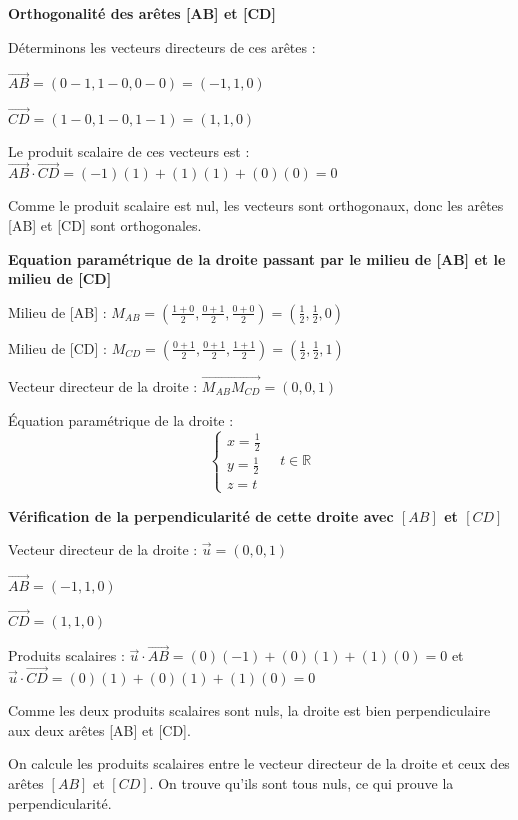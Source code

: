\documentclass[10pt,a4paper]{article}
\begin{document}
\q \textbf{Orthogonalité des arêtes [AB] et [CD]}

Déterminons les vecteurs directeurs de ces arêtes :

$\overrightarrow{AB} = (0-1, 1-0, 0-0) = (-1, 1, 0)$

$\overrightarrow{CD} = (1-0, 1-0, 1-1) = (1, 1, 0)$

Le produit scalaire de ces vecteurs est :
$\overrightarrow{AB} \cdot \overrightarrow{CD} = (-1)(1) + (1)(1) + (0)(0) = 0$

Comme le produit scalaire est nul, les vecteurs sont orthogonaux, donc les arêtes [AB] et [CD] sont
orthogonales.


\q \textbf{Equation paramétrique de la droite passant par le milieu de [AB] et le milieu de [CD]}

Milieu de [AB] : $M_{AB} = (\frac{1+0}{2}, \frac{0+1}{2}, \frac{0+0}{2}) = (\frac{1}{2}, \frac{1}{2}, 0)$

Milieu de [CD] : $M_{CD} = (\frac{0+1}{2}, \frac{0+1}{2}, \frac{1+1}{2}) = (\frac{1}{2}, \frac{1}{2}, 1)$

Vecteur directeur de la droite : $\overrightarrow{M_{AB}M_{CD}} = (0, 0, 1)$

Équation paramétrique de la droite :
$$ \begin{cases}
x = \frac{1}{2} \\
y = \frac{1}{2} \\
z = t
\end{cases} \quad t \in  \mathbb{R}$$


\q \textbf{Vérification de la perpendicularité de cette droite avec \([AB]\) et \([CD]\)}

Vecteur directeur de la droite : $\vec{u} = (0, 0, 1)$

$\overrightarrow{AB} = (-1, 1, 0)$

$\overrightarrow{CD} = (1, 1, 0)$

Produits scalaires :
$\vec{u} \cdot \overrightarrow{AB} = (0)(-1) + (0)(1) + (1)(0) = 0$ et
$\vec{u} \cdot \overrightarrow{CD} = (0)(1) + (0)(1) + (1)(0) = 0$

Comme les deux produits scalaires sont nuls, la droite est bien perpendiculaire aux deux arêtes [AB] et [CD].



On calcule les produits scalaires entre le vecteur directeur de la droite et ceux des arêtes
\([AB]\) et \([CD]\).
On trouve qu'ils sont tous nuls, ce qui prouve la perpendicularité.
\end{document}
